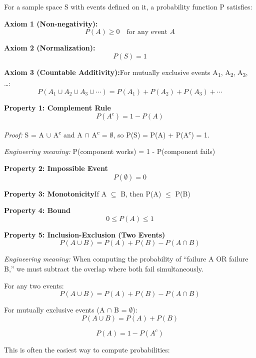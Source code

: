 

For a sample space S with events defined on it, a probability function P satisfies:

\textbf{Axiom 1 (Non-negativity):}\PSbr{}\[P(A) \geq 0 \quad \text{for any event } A\]

\textbf{Axiom 2 (Normalization):}\PSbr{}\[P(S) = 1\]

\textbf{Axiom 3 (Countable Additivity):}\PSbr{}For mutually exclusive events A\textsubscript{1}, A\textsubscript{2}, A\textsubscript{3}, …:\PSbr{}\[P(A_1 \cup A_2 \cup A_3 \cup \cdots) = P(A_1) + P(A_2) + P(A_3) + \cdots\]


\textbf{Property 1: Complement Rule}\PSbr{}\[P(A^c) = 1 - P(A)\]

\emph{Proof:} S = A \ensuremath{\cup} A\textsuperscript{c} and A \ensuremath{\cap} A\textsuperscript{c} = \ensuremath{\emptyset}, so P(S) = P(A) + P(A\textsuperscript{c}) = 1.

\emph{Engineering meaning:} P(component works) = 1 - P(component fails)

\textbf{Property 2: Impossible Event}\PSbr{}\[P(\emptyset) = 0\]

\textbf{Property 3: Monotonicity}\PSbr{}If A \ensuremath{\subseteq} B, then P(A) \ensuremath{\le} P(B)

\textbf{Property 4: Bound}\PSbr{}\[0 \leq P(A) \leq 1\]

\textbf{Property 5: Inclusion-Exclusion (Two Events)}\PSbr{}\[P(A \cup B) = P(A) + P(B) - P(A \cap B)\]

\emph{Engineering meaning:} When computing the probability of ``failure A OR failure B,'' we must subtract the overlap where both fail simultaneously.



For any two events:\PSbr{}\[P(A \cup B) = P(A) + P(B) - P(A \cap B)\]

For mutually exclusive events (A \ensuremath{\cap} B = \ensuremath{\emptyset}):\PSbr{}\[P(A \cup B) = P(A) + P(B)\]


\[P(A) = 1 - P(A^c)\]

This is often the easiest way to compute probabilities:

